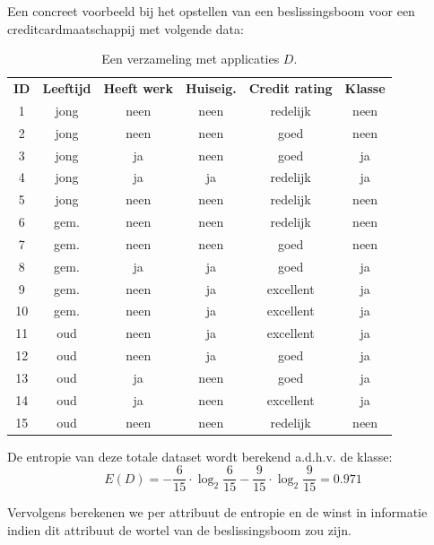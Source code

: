 Een concreet voorbeeld bij het opstellen van een beslissingsboom voor een creditcardmaatschappij met volgende data:
\begin{table}[h]
\centering
\caption{Een verzameling met applicaties $D$.}
\label{tabel:sl_ex1}
\begin{tabular}{c|c|c|c|c|c}
  \textbf{ID} & \textbf{Leeftijd} & \textbf{Heeft werk} & \textbf{Huiseig.} & \textbf{Credit rating} & \textbf{Klasse} \\
1 & jong 	& neen 	& neen 	& redelijk & neen  \\
2 & jong 	& neen 	& neen 	& goed & neen  \\
3 & jong 	& ja 	& neen 	& goed & ja  \\
4 & jong 	& ja 	& ja 	& redelijk & ja \\
5 & jong 	& neen 	& neen 	& redelijk & neen \\
6 & gem. & neen & neen & redelijk & neen \\
7 & gem. & neen & neen & goed & neen \\
8 & gem. & ja 	& ja 	& goed & ja \\
9 & gem. & neen & ja 	& excellent & ja \\
10 & gem. & neen & ja 	& excellent & ja \\
11 & oud 	& neen 	& ja 	& excellent & ja \\
12 & oud 	& neen 	& ja 	& goed & ja \\
13 & oud 	& ja 	& neen 	& goed & ja \\
14 & oud 	& ja 	& neen 	& excellent & ja \\
15 & oud 	& neen 	& neen 	& redelijk & neen \\
\end{tabular}
\end{table}

De entropie van deze totale dataset wordt berekend a.d.h.v. de klasse:
\begin{equation}
E(D) = -\frac{6}{15} \cdot \log_2 \frac{6}{15} - \frac{9}{15} \cdot \log_2 \frac{9}{15} = 0.971
\end{equation}

Vervolgens berekenen we per attribuut de entropie en de winst in informatie indien dit attribuut de wortel van de beslissingsboom zou zijn.

